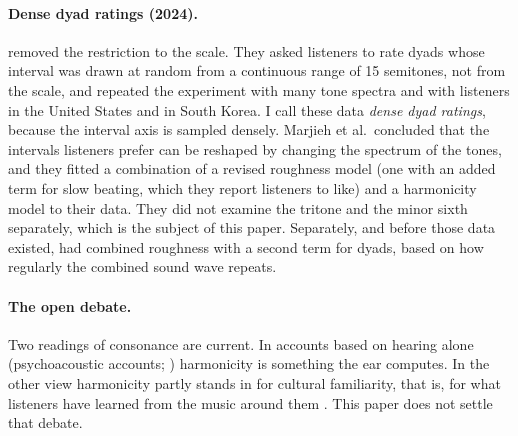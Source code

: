 \documentclass[11pt,a4paper]{article}
\begin{document}
\paragraph{Dense dyad ratings (2024).}
\citet{marjieh2024} removed the restriction to the scale. They asked listeners to rate dyads whose
interval was drawn at random from a continuous range of 15 semitones, not from the scale, and
repeated the experiment with many tone spectra and with listeners in the United States and in
South Korea. I call these data \emph{dense dyad ratings}, because the interval axis is sampled
densely. Marjieh et al.\ concluded that the intervals listeners prefer can be reshaped by
changing the spectrum of the tones, and they fitted a combination of a revised roughness model (one with an added term for slow beating, which they report listeners to like) and a harmonicity model to their data. They did not examine the tritone and the minor sixth separately, which is the subject of this paper. Separately, and before those data existed, \citet{masina2022} had combined
roughness with a second term for dyads, based on how regularly the combined sound wave
repeats.

\paragraph{The open debate.}
Two readings of consonance are current. In accounts based on hearing alone (psychoacoustic
accounts; \citealp{harrison2020,marjieh2024}) harmonicity is something the ear computes. In
the other view harmonicity partly stands in for cultural familiarity, that is, for what
listeners have learned from the music around them
\citep{lahdelma2022,mcdermott2016,milne2023}. This paper does not settle that debate.
\end{document}
